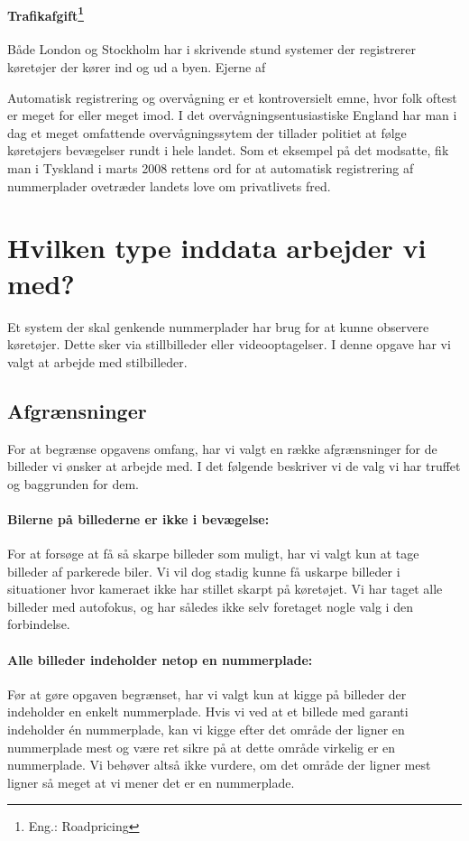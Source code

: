 \paragraph{Trafikafgift\footnote{Eng.: Roadpricing}}
Både London og Stockholm har i skrivende stund systemer der registrerer køretøjer der kører ind og ud a byen. Ejerne af   


Automatisk registrering og overvågning er et kontroversielt emne, hvor folk oftest er meget for eller meget imod. I det overvågningsentusiastiske England har man i dag et meget omfattende overvågningssytem der tillader politiet at følge køretøjers bevægelser rundt i hele landet\cite{wiki_baggrund}. Som et eksempel på det modsatte, fik man i Tyskland i marts 2008 rettens ord for at automatisk registrering af nummerplader ovetræder landets love om privatlivets fred\cite{tysk_ulovlig}.


\section{Hvilken type inddata arbejder vi med?}
\label{sec:data}
Et system der skal genkende nummerplader har brug for at kunne observere køretøjer. Dette sker via stillbilleder eller videooptagelser. I denne opgave har vi valgt at arbejde med stilbilleder.

\subsection{Afgrænsninger}
For at begrænse opgavens omfang, har vi valgt en række afgrænsninger for de billeder vi ønsker at arbejde med. I det følgende beskriver vi de valg vi har truffet og baggrunden for dem.

\paragraph{Bilerne på billederne er ikke i bevægelse:}
For at forsøge at få så skarpe billeder som muligt, har vi valgt kun at tage billeder af parkerede biler. Vi vil dog stadig kunne få uskarpe billeder i situationer hvor kameraet ikke har stillet skarpt på køretøjet. Vi har taget alle billeder med autofokus, og har således ikke selv foretaget nogle valg i den forbindelse.

\paragraph{Alle billeder indeholder netop en nummerplade:}
Før at gøre opgaven begrænset, har vi valgt kun at kigge på billeder der indeholder en enkelt nummerplade. Hvis vi ved at et billede med garanti indeholder én nummerplade, kan vi kigge efter det område der ligner en nummerplade mest og være ret sikre på at dette område virkelig er en nummerplade. Vi behøver altså ikke vurdere, om det område der ligner mest ligner så meget at vi mener det er en nummerplade.

